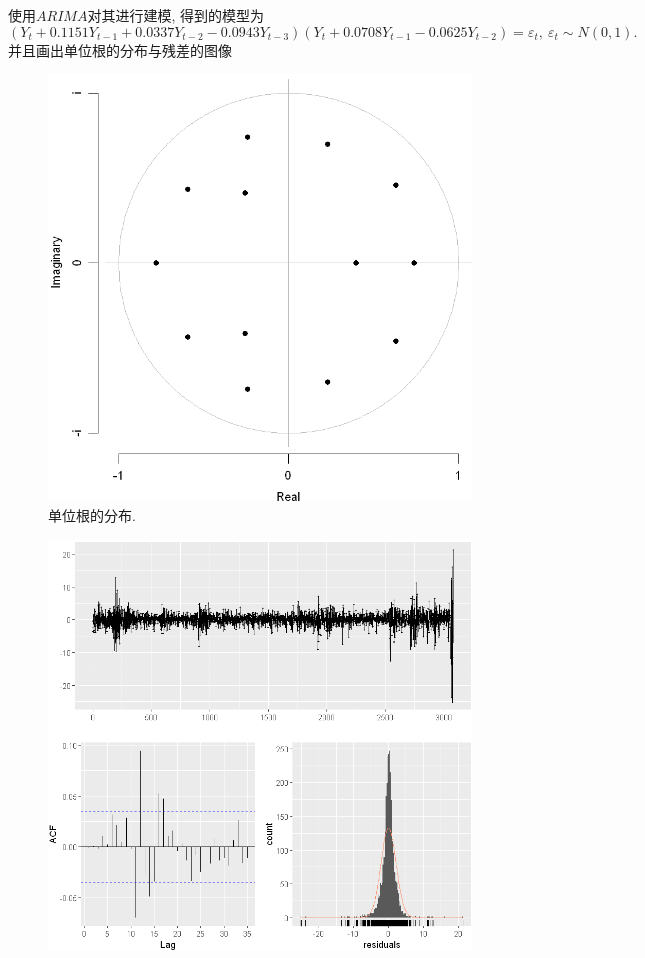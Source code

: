 \documentclass[11pt]{article}
\begin{document}
\qquad 使用$ARIMA$对其进行建模, 得到的模型为
\[
    \left(Y_t+0.1151 Y_{t-1}+ 0.0337Y_{t-2}-0.0943 Y_{t-3}\right)\left(Y_t+0.0708Y_{t-1}-0.0625Y_{t-2}\right)=\varepsilon_t,\ \varepsilon_t\sim N(0,1).
\]
并且画出单位根的分布与残差的图像
\begin{center}
    \hspace{30pt}\begin{minipage}{0.45\textwidth}
        \begin{figure}
            \centering
            \hspace{-30pt}\includegraphics[width=.9\textwidth]{output_14_0}
            \caption{单位根的分布.\label{fig:5}}
        \end{figure}
    \end{minipage}
    \begin{minipage}{0.45\textwidth}
        \begin{figure}
            \centering
            \hspace{-25pt}\includegraphics[width=.9\textwidth]{output_16_1}

\end{figure}
\end{minipage}
\end{center}
\end{document}
